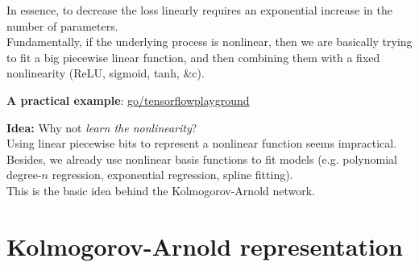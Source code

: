 \begin{frame}
    In essence, to decrease the loss linearly requires an exponential increase in the number of parameters. \\

    Fundamentally, if the underlying process is nonlinear, then we are basically trying to fit a big piecewise
    linear function, and then combining them with a fixed nonlinearity (ReLU, sigmoid, tanh, \&c).
\end{frame}

\begin{frame}
    \textbf{A practical example}: \url{go/tensorflowplayground}
\end{frame}

\begin{frame}
    \textbf{Idea:} Why not \textit{learn the nonlinearity}? \\
    \vspace{5mm}
    Using linear piecewise bits to represent a nonlinear function seems impractical. Besides, we already
    use nonlinear basis functions to fit models (e.g. polynomial degree-$n$ regression, exponential
    regression, spline fitting). \\
    \vspace{5mm}
    This is the basic idea behind the Kolmogorov-Arnold network.
\end{frame}

\section{Kolmogorov-Arnold representation}

